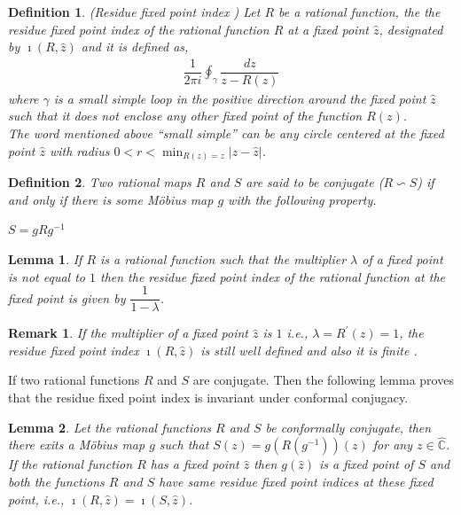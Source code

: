 \documentclass[a4paper,12pt,reqno]{amsart}
\newtheorem{definition}{Definition}
\newtheorem{lemma}{Lemma}
\newtheorem*{remark}{Remark}
\begin{document}
\begin{definition}{(Residue fixed point index )}\cite{Milnor}
Let $R$ be a rational function, the the residue fixed point index of the rational function $R$ at a fixed point $\hat{z}$, designated by $\imath(R,\hat{z})$ and it is defined as,
\begin{align*}
\dfrac{1}{2\pi i}\oint_{\gamma}\dfrac{dz}{z-R(z)}
\end{align*} 
where $\gamma$ is a small simple loop in the positive direction around the fixed point $\hat{z}$ such that it does not enclose any other fixed point of the function $R(z)$.\\
The word  mentioned above ``small simple'' can be any circle centered at the fixed point $\hat{z}$ with radius $0<r<\displaystyle\min_{R(z)=z}\vert z-\hat{z}\vert$.\\
\end{definition} 

\begin{definition}
    
Two rational maps $R$ and $S$ are said to be conjugate ($R \backsim S$) if and only if there is some M\"obius map $g$ with the following  property.
\begin{center}
$S=gRg^{-1}$
\end{center}
\end{definition}

\begin{lemma}\cite{The real non-attractive fixed point conjecture and beyond} If $R$ is a rational function such that the multiplier $\lambda$ of a fixed point is not equal to $1$ then the residue fixed point index of the rational function at the fixed point is given by $\dfrac{1}{1-\lambda}$.
\end{lemma}



 
\begin{remark}
    
If the multiplier of a fixed point $\hat{z}$ is $1$ i.e., $\lambda=R^{\prime}(\hat{z})=1$, the residue fixed point index $\imath(R,\hat{z})$ is still well defined and also it is finite \cite[Problem 12-a]{Milnor}.\\
\end{remark}


If two rational functions $R$ and $S$ are conjugate. Then the following lemma proves that the residue fixed point index is invariant under conformal conjugacy.

 
\begin{lemma}
\cite{The real non-attractive fixed point conjecture and beyond}
Let the rational functions $R$ and $S$ be conformally conjugate, then there exits a M\"obius map $g$ such that $S(z)=g(R(g^{-1}))(z)$ for any $z\in\widehat{\mathbb{C}}$. If the rational function $R$ has a fixed point $\hat{z}$ then $g(\hat{z})$ is a fixed point of $S$ and both the functions $R$ and $S$ have same residue fixed point indices at these fixed point, i.e., $\imath(R,\hat{z})=\imath(S,\hat{z})$.
\end{lemma}
 
\end{document}
